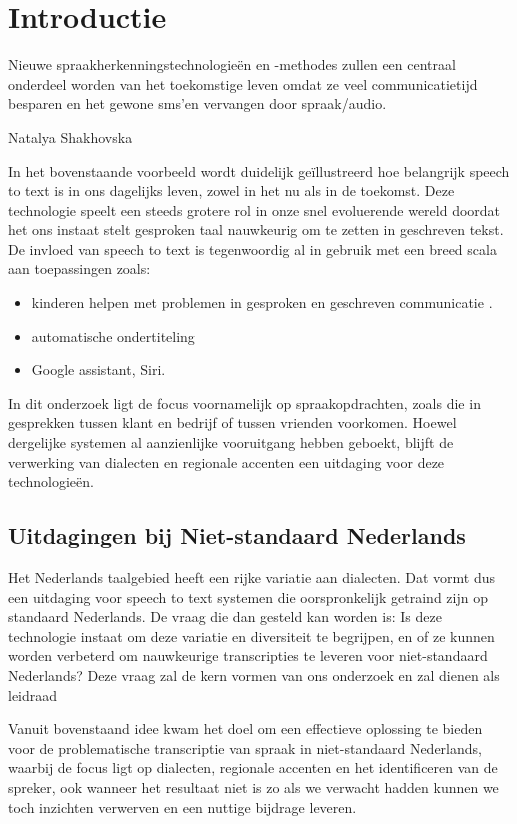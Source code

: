 
\section{Introductie}
\label{sec:introductie}
\epigraph{Nieuwe spraakherkenningstechnologieën en -methodes zullen een centraal onderdeel worden van 
    het toekomstige leven omdat ze veel communicatietijd besparen en het gewone sms'en 
    vervangen door spraak/audio.}{Natalya Shakhovska}
    
In het bovenstaande voorbeeld wordt duidelijk geïllustreerd hoe belangrijk speech to text is in ons dagelijks leven, zowel in het nu als in de toekomst. Deze technologie speelt een steeds grotere rol in onze snel evoluerende wereld doordat het ons instaat stelt gesproken taal nauwkeurig om te zetten in geschreven tekst. De invloed van speech to text is tegenwoordig al in gebruik met een breed scala aan toepassingen zoals:
\begin{itemize}
    \item kinderen helpen met problemen in gesproken en geschreven communicatie \autocite{Kambouri2023}.
    \item automatische ondertiteling
    \item Google assistant, Siri.
\end{itemize}
In dit onderzoek ligt de focus voornamelijk op spraakopdrachten, zoals die in gesprekken tussen klant en bedrijf of tussen vrienden voorkomen. Hoewel dergelijke systemen al aanzienlijke vooruitgang hebben geboekt, blijft de verwerking van dialecten en regionale accenten een uitdaging voor deze technologieën.

\subsection{Uitdagingen bij Niet-standaard Nederlands}
Het Nederlands taalgebied heeft een rijke variatie aan dialecten. Dat vormt dus een uitdaging voor speech to text systemen die oorspronkelijk getraind zijn op standaard Nederlands. De vraag die dan gesteld kan worden is: Is deze technologie instaat om deze variatie en diversiteit te begrijpen, en of ze kunnen worden verbeterd om nauwkeurige transcripties te leveren voor niet-standaard Nederlands?
Deze vraag zal de kern vormen van ons onderzoek en zal dienen als leidraad

Vanuit bovenstaand idee kwam het doel om een effectieve oplossing te bieden voor de problematische transcriptie van spraak in niet-standaard Nederlands, waarbij de focus ligt op dialecten, regionale accenten en het identificeren van de spreker, ook wanneer het resultaat niet is zo als we verwacht hadden kunnen we toch inzichten verwerven en een nuttige bijdrage leveren.

